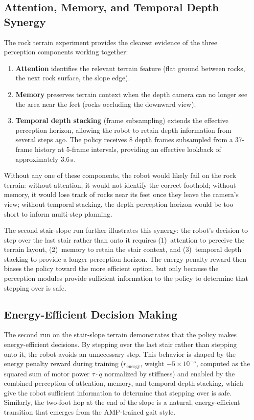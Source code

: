 \subsection{Attention, Memory, and Temporal Depth Synergy}
\label{sec:attention_memory_synergy}

The rock terrain experiment provides the clearest evidence of the three perception components working together:

\begin{enumerate}
    \item \textbf{Attention} identifies the relevant terrain feature (flat ground between rocks, the next rock surface, the slope edge).
    \item \textbf{Memory} preserves terrain context when the depth camera can no longer see the area near the feet (rocks occluding the downward view).
    \item \textbf{Temporal depth stacking} (frame subsampling) extends the effective perception horizon, allowing the robot to retain depth information from several steps ago. The policy receives 8 depth frames subsampled from a 37-frame history at 5-frame intervals, providing an effective lookback of approximately 3.6\,s.
\end{enumerate}

Without any one of these components, the robot would likely fail on the rock terrain: without attention, it would not identify the correct foothold; without memory, it would lose track of rocks near its feet once they leave the camera's view; without temporal stacking, the depth perception horizon would be too short to inform multi-step planning.

The second stair-slope run further illustrates this synergy: the robot's decision to step over the last stair rather than onto it requires (1)~attention to perceive the terrain layout, (2)~memory to retain the stair context, and (3)~temporal depth stacking to provide a longer perception horizon. The energy penalty reward then biases the policy toward the more efficient option, but only because the perception modules provide sufficient information to the policy to determine that stepping over is safe.

\subsection{Energy-Efficient Decision Making}
\label{sec:energy_efficient}

The second run on the stair-slope terrain demonstrates that the policy makes energy-efficient decisions. By stepping over the last stair rather than stepping onto it, the robot avoids an unnecessary step. This behavior is shaped by the energy penalty reward during training ($r_{\mathrm{energy}}$, weight $-5 \times 10^{-5}$, computed as the squared sum of motor power $\tau \cdot \dot{q}$ normalized by stiffness) and enabled by the combined perception of attention, memory, and temporal depth stacking, which give the robot sufficient information to determine that stepping over is safe. Similarly, the two-foot hop at the end of the slope is a natural, energy-efficient transition that emerges from the AMP-trained gait style.

